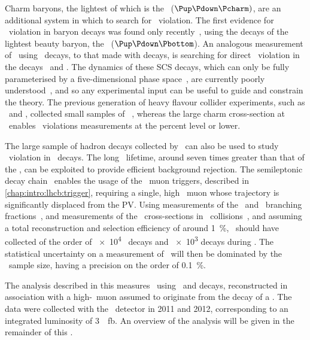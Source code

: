 
Charm baryons, the lightest of which is the \PLambdac~($\Pup\Pdown\Pcharm)$,
are an additional system in which to search for \CP\ violation.
The first evidence for \CP\ violation in baryon decays was found only
recently~\cite{Aaij:2016cla}, using the decays of the lightest beauty baryon,
the \PLambdab~($\Pup\Pdown\Pbottom$).
An analogous measurement of \dACP\ using \PLambdac\ decays, to that made with
\PDzero decays, is searching for direct \CP\ violation in the decays \LcTopKK\
and \LcToppipi.
The dynamics of these \ac{SCS} decays, which can only be fully parameterised by
a five-dimensional phase space~\cite{Aitala:1999uq}, are currently poorly
understood~\cite{Bigi:2012ev,PDG2014}, and so any experimental input can be
useful to guide and constrain the theory.
The previous generation of heavy flavour collider experiments, such as \belle\
and \babar, collected small samples of \PLambdac~\cite{Seuster:2005tr}, whereas
the large charm cross-section at \lhcb\ enables \CP\ violations measurements at
the percent level or lower.

The large sample of \Pbottom hadron decays collected by \lhcb\ can also be used
to study \CP\ violation in \PLambdac\ decays.
The long \PLambdab\ lifetime, around seven times greater than that of the
\PLambdac, can be exploited to provide efficient background rejection.
The semileptonic decay chain \LbToLcmuX\ enables the usage of the \lhcb\ muon
triggers, described in \cref{chap:intro:lhcb:trigger}, requiring a single, high
\pT\ muon whose trajectory is significantly displaced from the \ac{PV}.
Using measurements of the \LbToLcmuX\ and \LcTophh\ branching
fractions~\cite{PDG2014,Ablikim:2016tze}, and measurements of the \PLambdab\
cross-sections in \pp\ collisions~\cite{Aaij:2015fea}, and assuming a total
reconstruction and selection efficiency of around \SI{1}{\percent}, \lhcb\
should have collected of the order of \num{e4} \ppipi\ decays and \num{e3} \pKK
decays during \runone.
The statistical uncertainty on a measurement of \dACP\ will then be dominated
by the \pKK\ sample size, having a precision on the order of
\SI{0.1}{\percent}.

The analysis described in this \lcnamecref{chap:cpv} measures \dACP\ using
\LcTopKK\ and \LcToppipi decays, reconstructed in association with a high-\pT\
muon assumed to originate from the decay of a \PLambdab.
The data were collected with the \lhcb\ detector in 2011 and 2012,
corresponding to an integrated luminosity of \SI{3}{\per\femto\barn}.
An overview of the analysis will be given in the remainder of this
\lcnamecref{chap:cpv:introduction}.


